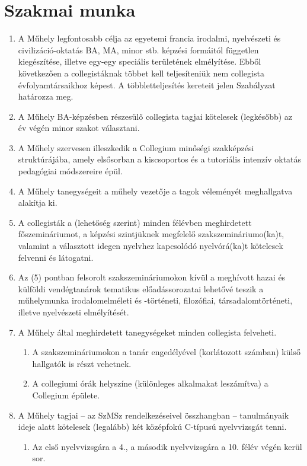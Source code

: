 \documentclass{../styles/rulebook}
\begin{document}
\section{Szakmai munka}

\begin{enumerate}
	\item A Műhely legfontosabb célja az egyetemi francia irodalmi, nyelvészeti és civilizáció-oktatás BA, MA, minor stb. képzési formáitól független kiegészítése, illetve egy-egy speciális területének elmélyítése. Ebből következően a collegistáknak többet kell teljesíteniük nem collegista évfolyamtársaikhoz képest. A többletteljesítés kereteit jelen Szabályzat határozza meg.
	\item A Műhely BA-képzésben részesülő collegista tagjai kötelesek (legkésőbb) az év végén minor szakot választani.
	\item A Műhely szervesen illeszkedik a Collegium minőségi szakképzési struktúrájába, amely elsősorban a kiscsoportos és a tutoriális intenzív oktatás pedagógiai módszereire épül.
	\item A Műhely tanegységeit a műhely vezetője a tagok véleményét meghallgatva alakítja ki. 
	\item A collegisták a (lehetőség szerint) minden félévben meghirdetett főszemináriumot, a képzési szintjüknek megfelelő szakszemináriumo(ka)t, valamint a választott idegen nyelvhez kapcsolódó nyelvórá(ka)t kötelesek felvenni és látogatni.
	\item Az (5) pontban felsorolt szakszemináriumokon kívül a meghívott hazai és külföldi vendégtanárok tematikus előadássorozatai lehetővé teszik a műhelymunka irodalomelméleti és -történeti, filozófiai, társadalomtörténeti, illetve nyelvészeti elmélyítését.
	\item A Műhely által meghirdetett tanegységeket minden collegista felveheti.
	\begin{enumerate}
		\item A szakszemináriumokon a tanár engedélyével (korlátozott számban) külső hallgatók is részt vehetnek. \item A collegiumi órák helyszíne (különleges alkalmakat leszámítva) a Collegium épülete.
	\end{enumerate}
	\item A Műhely tagjai -- az SzMSz rendelkezéseivel összhangban -- tanulmányaik ideje alatt kötelesek (legalább) két középfokú C-típusú nyelvvizsgát tenni. 
	\begin{enumerate}
		\item Az első nyelvvizsgára a 4., a második nyelvvizsgára a 10. félév végén kerül sor.

\end{enumerate}
\end{enumerate}
\end{document}
